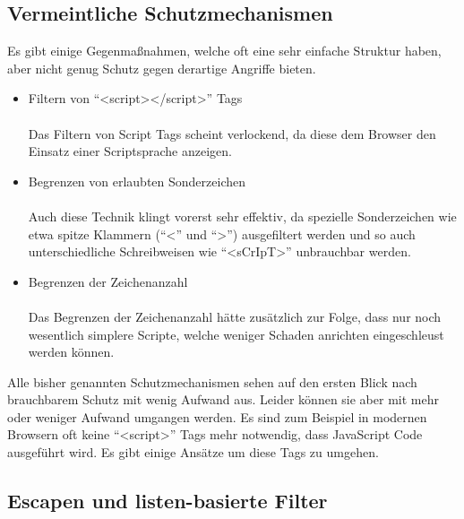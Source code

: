 \clearpage
\subsection{Vermeintliche Schutzmechanismen}
Es gibt einige Gegenma{\ss}nahmen, welche oft eine sehr einfache Struktur haben, aber nicht genug Schutz gegen derartige Angriffe bieten.\\
\begin{itemize}
\item Filtern von ``<script></script>'' Tags\\\\
Das Filtern von Script Tags scheint verlockend, da diese dem Browser den Einsatz einer Scriptsprache anzeigen.\\
\item Begrenzen von erlaubten Sonderzeichen\\\\
Auch diese Technik klingt vorerst sehr effektiv, da spezielle Sonderzeichen wie etwa spitze Klammern (``<'' und ``>'') ausgefiltert werden und so auch unterschiedliche Schreibweisen wie ``<sCrIpT>'' unbrauchbar werden.\\
\item Begrenzen der Zeichenanzahl\\\\
Das Begrenzen der Zeichenanzahl h\"atte zus\"atzlich zur Folge, dass nur noch wesentlich simplere Scripte, welche weniger Schaden anrichten eingeschleust werden k\"onnen.\\
\end{itemize}

Alle bisher genannten Schutzmechanismen sehen auf den ersten Blick nach brauchbarem Schutz mit wenig Aufwand aus. Leider k\"onnen sie aber mit mehr oder weniger Aufwand umgangen werden. Es sind zum Beispiel in modernen Browsern oft keine ``<script>'' Tags mehr notwendig, dass JavaScript Code ausgef\"uhrt wird. Es gibt einige Ans\"atze um diese Tags zu umgehen.
\cite{xssBuch}

\clearpage
\subsection{Escapen und listen-basierte Filter}
